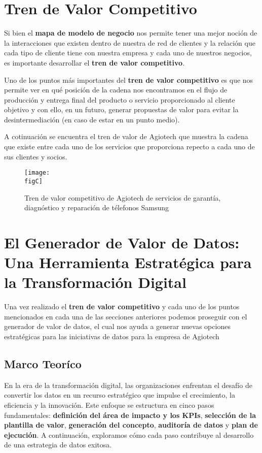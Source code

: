 

\clearpage
\section{Tren de Valor Competitivo}

Si bien el \textbf{mapa de modelo de negocio} nos permite tener una mejor noción
de la interacciones que existen dentro de nuestra de red de clientes y la relación
que cada tipo de cliente tiene con nuestra empresa y cada uno de nuestros negocios,
es importante desarrollar el \textbf{tren de valor competitivo}.

Uno de los puntos más importantes del \textbf{tren de valor competitivo} es que nos permite
ver en qué posición de la cadena nos encontramos en el flujo de producción y entrega final del producto o servicio proporcionado al cliente objetivo y con ello, en un futuro, generar propuestas de valor para evitar la desintermediación (en caso de estar en un punto medio).

A cotinuación se encuentra el tren de valor de Agiotech que muestra la cadena que
existe entre cada uno de los servicios que proporciona repecto a cada uno de sus
clientes y socios.

\begin{figure}[ht]
	\centering
	\texttt{[image: \\figC]}
	\caption{Tren de valor competitivo de Agiotech de servicios de garantía, diagnóstico
		y reparación de télefonos Samsung}
\end{figure}


\clearpage
\section{El Generador de Valor de Datos: Una Herramienta Estratégica para la Transformación
  Digital}

Una vez realizado el \textbf{tren de valor competitivo} y cada uno de los puntos
mencionados en cada una de las secciones anteriores podemos proseguir con el generador
de valor de datos, el cual nos ayuda a generar nuevas opciones estratégicas para
las iniciativas de datos para la empresa de Agiotech

\subsection{Marco Teoríco}

En la era de la transformación digital, las organizaciones enfrentan el desafío de
convertir los datos en un recurso estratégico que impulse el crecimiento, la
eficiencia y la innovación. Este enfoque se estructura en cinco pasos fundamentales:
\textbf{definición del área de impacto y los KPIs}, \textbf{selección de la
	plantilla de valor}, \textbf{generación del concepto}, \textbf{auditoría de
	datos} y \textbf{plan de ejecución}. A continuación, exploramos cómo cada paso
contribuye al desarrollo de una estrategia de datos exitosa.

